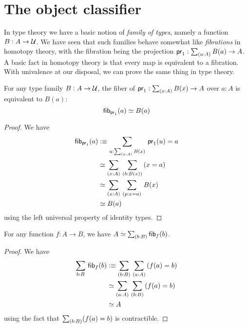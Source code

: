 \section{The object classifier}
\label{sec:object-classification}

In type theory we have a basic notion of \emph{family of types}, namely a function $B:A\to\mathcal{U}$.
We have seen that such families behave somewhat like \emph{fibrations} in homotopy theory, with the fibration being the projection $\proj1:\sm{a:A} B(a) \to A$.
A basic fact in homotopy theory is that every map is equivalent to a fibration.
With univalence at our disposal, we can prove the same thing in type theory.

\begin{lem}\label{thm:fiber-of-a-fibration}
  For any type family $B:A\to\mathcal{U}$, the fiber of $\proj1:\sm{x:A} B(x) \to A$ over $a:A$ is equivalent to $B(a)$:
  \[ {\mathsf{fib}}_{\mathsf{pr}_{1}}(a) \simeq B(a) \]
\end{lem}
\begin{proof}
  We have
  \begin{align*}
    \hfib{\proj1}{a} &\defeq \sm{u:\sm{x:A} B(x)} \proj1(u)=a\\
    &\simeq \sm{x:A}{b:B(x)} (x=a)\\
    &\simeq \sm{x:A}{p:x=a} B(x)\\
    &\simeq B(a)
  \end{align*}
  using the left universal property of identity types.
\end{proof}

\begin{lem}\label{thm:total-space-of-the-fibers}
  For any function $f:A\to B$, we have $\eqv{A}{\sm{b:B}\hfib{f}{b}}$.
\end{lem}
\begin{proof}
  We have
  \begin{align*}
    \sm{b:B}\hfib{f}{b} &\defeq \sm{b:B}{a:A} (f(a)=b)\\
    &\simeq \sm{a:A}{b:B} (f(a)=b)\\
    &\simeq A
  \end{align*}
  using the fact that $\sm{b:B} (f(a)=b)$ is contractible.
\end{proof}

